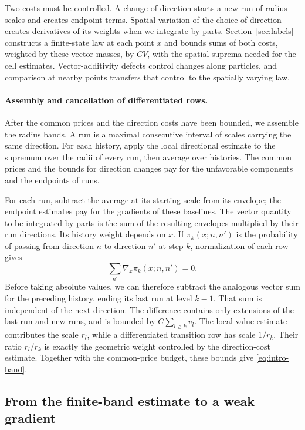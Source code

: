 Two costs must be controlled. A change of direction starts a new
run of radius scales and creates endpoint terms. Spatial variation
of the choice of direction creates derivatives of its weights
when we integrate by parts. Section~\ref{sec:labels} constructs a finite-state
law at each point $x$ and bounds sums of both costs, weighted
by these vector masses, by $CV$, with the spatial suprema needed
for the cell estimates. Vector-additivity
defects control changes along particles, and comparison at nearby
points transfers that control to the spatially varying law.

\paragraph{Assembly and cancellation of differentiated rows.}
After the common prices and the direction costs have been
bounded, we assemble the radius bands. A run is a maximal consecutive
interval of scales carrying the same direction. For each history,
apply the local directional estimate to the supremum over the
radii of every run, then average over histories. The common
prices and the bounds for direction changes pay for the
unfavorable components and the endpoints of runs.

For each run, subtract the average at its starting scale from
its envelope; the endpoint estimates pay for the gradients of
these baselines. The vector quantity to be integrated by parts
is the sum of the resulting envelopes multiplied by their run
directions. Its history weight depends on $x$. If
$\pi_k(x;n,n')$ is the probability of passing from direction $n$
to direction $n'$ at step $k$, normalization of each row gives
\[
 \sum_{n'}\nabla_x\pi_k(x;n,n')=0.
\]
Before taking absolute values, we can therefore subtract the
analogous vector sum for the preceding history, ending its last
run at level $k-1$. That sum is independent of the next direction.
The difference contains only extensions of the last run and new
runs, and is bounded by $C\sum_{l\ge k}v_l$. The local value
estimate contributes the scale $r_l$, while a differentiated
transition row has scale $1/r_k$. Their ratio $r_l/r_k$ is
exactly the geometric weight controlled by the direction-cost
estimate. Together with the common-price budget, these bounds
give \eqref{eq:intro-band}.

\subsection{From the finite-band estimate to a weak gradient}

